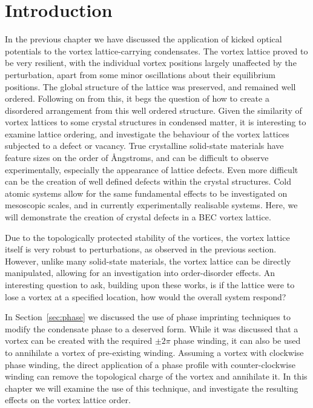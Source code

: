 \section{Introduction}\label{sec:ch6_intro}
In the previous chapter we have discussed the application of kicked optical potentials to the vortex lattice-carrying condensates. The vortex lattice proved to be very resilient, with the individual vortex positions largely unaffected by the perturbation, apart from some minor oscillations about their equilibrium positions. The global structure of the lattice was preserved, and remained well ordered. Following on from this, it begs the question of how to create a disordered arrangement from this well ordered structure. Given the similarity of vortex lattices to some crystal structures in condensed matter, it is interesting to examine lattice ordering, and investigate the behaviour of the vortex lattices subjected to a defect or vacancy. True crystalline solid-state materials have feature sizes on the order of {\AA}ngstroms, and can be difficult to observe experimentally, especially the appearance of lattice defects. Even more difficult can be the creation of well defined defects within the crystal structures. Cold atomic systems allow for the same fundamental effects to be investigated on mesoscopic scales, and in currently experimentally realisable systems. Here, we will demonstrate the creation of crystal defects in a BEC vortex lattice.

Due to the topologically protected stability of the vortices, the vortex lattice itself is very robust to perturbations, as observed in the previous section. However, unlike many solid-state materials, the vortex lattice can be directly manipulated, allowing for an investigation into order-disorder effects. An interesting question to ask, building upon these works, is if the lattice were to lose a vortex at a specified location, how would the overall system respond?

In Section~\ref{sec:phase} we discussed the use of phase imprinting techniques to modify the condensate phase to a deserved form. While it was discussed that a vortex can be created with the required $\pm 2\pi$ phase winding, it can also be used to annihilate a vortex of pre-existing winding. Assuming a vortex with clockwise phase winding, the direct application of a phase profile with counter-clockwise winding can remove the topological charge of the vortex and annihilate it. In this chapter we will examine the use of this technique, and investigate the resulting effects on the vortex lattice order.

